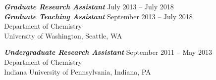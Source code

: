 \documentclass[10pt]{res} %
\begin{document}
\begin{resume}
{\sl \bf Graduate Research Assistant} \dotfill July 2013 -- July 2018 \\
{\sl \bf Graduate Teaching Assistant} \dotfill September 2013 -- July 2018 \\
Department of Chemistry \\
University of Washington, Seattle, WA 

{\sl \bf Undergraduate Research Assistant} \dotfill September 2011 -- May 2013 \\
Department of Chemistry \\
Indiana University of Pennsylvania, Indiana, PA



\end{resume}
\end{document}
